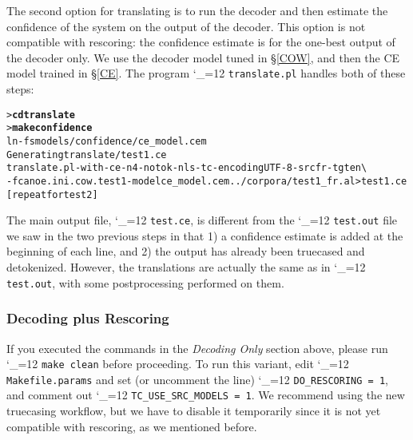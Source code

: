 \documentclass[11pt,letterpaper]{article}
\newcommand{\bs}{\textbackslash{}}
\def\code{\begingroup\catcode`\_=12 \codex}
\newcommand{\codex}[1]{\texttt{#1}\endgroup}
\begin{document}
The second option for translating is to run the decoder and then estimate the
confidence of the system on the output of the decoder.  This option is not
compatible with rescoring: the confidence estimate is for the one-best output
of the decoder only.  We use the decoder model tuned in \S\ref{COW}, and
then the CE model trained in \S\ref{CE}.  The program
\code{translate.pl} handles both of these steps:
\begin{small}
\begin{alltt}
   > \textbf{cd translate}
   > \textbf{make confidence}
   ln -fs models/confidence/ce_model.cem
   Generating translate/test1.ce
   translate.pl -with-ce -n 4 -notok -nl s -tc -encoding UTF-8 -src fr -tgt en \bs
      -f canoe.ini.cow.test1 -model ce_model.cem ../corpora/test1_fr.al > test1.ce
   [repeat for test2]
\end{alltt}
\end{small}
The main output file, \code{test.ce}, is different from the \code{test.out}
file we saw in the two previous steps in that 1) a confidence estimate is added
at the beginning of each line, and 2) the output has already been
truecased and detokenized. However, the translations are actually the same as in
\code{test.out}, with some postprocessing performed on them.

\subsubsection{Decoding plus Rescoring} \label{RATTrans}

If you executed the commands in the \emph{Decoding Only} section above, please
run \code{make clean} before proceeding.  To run this variant, edit
\code{Makefile.params} and set (or uncomment the line) \code{DO_RESCORING = 1},
and comment out \code{TC_USE_SRC_MODELS = 1}.  We recommend using the new
truecasing workflow, but we have to disable it temporarily since it is not yet
compatible with rescoring, as we mentioned before.
\end{document}
